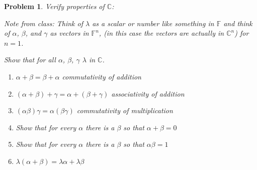 \documentclass{article}
\theoremstyle{problemstyle}
\newtheorem{problem}{Problem}
\theoremstyle{problemstyle}
\begin{document}
\begin{problem}
Verify properties of $\mathbb{C}$: 

Note from class: Think of $\lambda$ as a scalar or number like something in $\mathbb{F}$ and think of $\alpha$, $\beta$, and $\gamma$ as vectors in $\mathbb{F}^n$, (in this case the vectors are actually in $\mathbb{C}^n$) for $n = 1$.  

Show that for all $\alpha$, $\beta$, $\gamma$ $\lambda$ in $\mathbb{C}$. 
\begin{enumerate}
\item $\alpha + \beta = \beta + \alpha$  commutativity of addition
\item $(\alpha+\beta)+\gamma = \alpha+(\beta + \gamma)$ associativity of addition
\item $(\alpha\beta)\gamma = \alpha(\beta\gamma)$ commutativity of multiplication
\item Show that for every $\alpha$ there is a $\beta$ so that $\alpha + \beta = 0$
\item Show that for every $\alpha$ there is a $\beta$ so that $\alpha\beta = 1$
\item $\lambda(\alpha+\beta) = \lambda\alpha +\lambda\beta$
\end{enumerate}
\end{problem}
\end{document}
